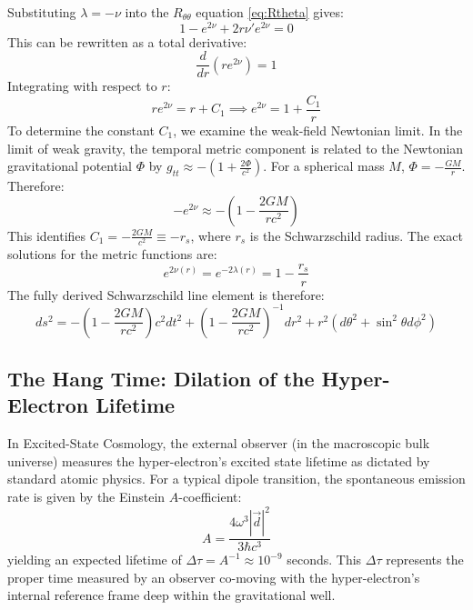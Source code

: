 Substituting $\lambda = -\nu$ into the $R_{\theta\theta}$ equation \eqref{eq:Rtheta} gives:
\begin{equation}
1 - e^{2\nu} + 2r\nu' e^{2\nu} = 0
\end{equation}
This can be rewritten as a total derivative:
\begin{equation}
\frac{d}{dr} \left( r e^{2\nu} \right) = 1
\end{equation}
Integrating with respect to $r$:
\begin{equation}
r e^{2\nu} = r + C_1 \implies e^{2\nu} = 1 + \frac{C_1}{r}
\end{equation}
To determine the constant $C_1$, we examine the weak-field Newtonian limit. In the limit of weak gravity, the temporal metric component is related to the Newtonian gravitational potential $\Phi$ by $g_{tt} \approx -(1 + \frac{2\Phi}{c^2})$. For a spherical mass $M$, $\Phi = -\frac{GM}{r}$. Therefore:
\begin{equation}
-e^{2\nu} \approx -\left(1 - \frac{2GM}{rc^2}\right)
\end{equation}
This identifies $C_1 = -\frac{2GM}{c^2} \equiv -r_s$, where $r_s$ is the Schwarzschild radius. The exact solutions for the metric functions are:
\begin{equation}
e^{2\nu(r)} = e^{-2\lambda(r)} = 1 - \frac{r_s}{r}
\end{equation}
The fully derived Schwarzschild line element is therefore:
\begin{equation}
ds^2 = -\left(1 - \frac{2GM}{rc^2}\right) c^2 dt^2 + \left(1 - \frac{2GM}{rc^2}\right)^{-1} dr^2 + r^2(d\theta^2 + \sin^2\theta d\phi^2)
\end{equation}

\subsection{The Hang Time: Dilation of the Hyper-Electron Lifetime}

In Excited-State Cosmology, the external observer (in the macroscopic bulk universe) measures the hyper-electron's excited state lifetime as dictated by standard atomic physics. For a typical dipole transition, the spontaneous emission rate is given by the Einstein $A$-coefficient:
\begin{equation}
A = \frac{4\omega^3 |\vec{d}|^2}{3\hbar c^3}
\end{equation}
yielding an expected lifetime of $\Delta \tau = A^{-1} \approx 10^{-9}$ seconds. This $\Delta \tau$ represents the proper time measured by an observer co-moving with the hyper-electron's internal reference frame deep within the gravitational well.

